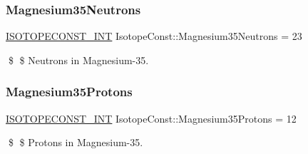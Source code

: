 \subsubsection{\texorpdfstring{Magnesium35\+Neutrons}{Magnesium35Neutrons}}
{\footnotesize\ttfamily \mbox{\hyperlink{group___isotope_const-_macros_ga5f18360b3e99483a35c32d789e62621c}{I\+S\+O\+T\+O\+P\+E\+C\+O\+N\+S\+T\+\_\+\+I\+NT}} Isotope\+Const\+::\+Magnesium35\+Neutrons = 23}

\$ \$ Neutrons in Magnesium-\/35. \mbox{\label{group___isotope_const-_magnesium-_mg35_gadcdd981bd108d6307abe55574fe20ebf}} 
\subsubsection{\texorpdfstring{Magnesium35\+Protons}{Magnesium35Protons}}
{\footnotesize\ttfamily \mbox{\hyperlink{group___isotope_const-_macros_ga5f18360b3e99483a35c32d789e62621c}{I\+S\+O\+T\+O\+P\+E\+C\+O\+N\+S\+T\+\_\+\+I\+NT}} Isotope\+Const\+::\+Magnesium35\+Protons = 12}

\$ \$ Protons in Magnesium-\/35. 